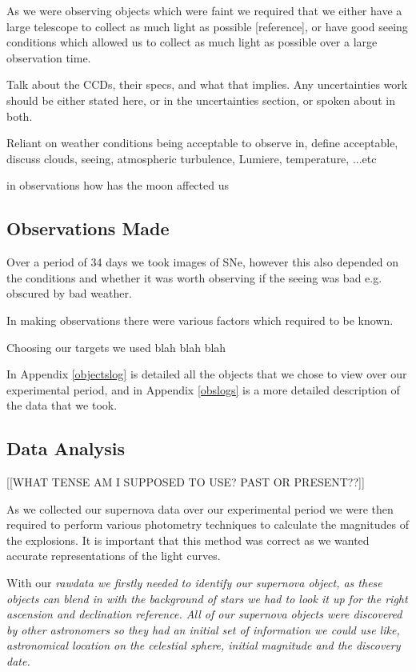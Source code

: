 \documentclass[twocolumn]{revtex4}
\begin{document}
As we were observing objects which were faint we required that we either have a large telescope to collect as much light as possible [reference], or have good seeing conditions which allowed us to collect as much light as possible over a large observation time.

Talk about the CCDs, their specs, and what that implies. Any uncertainties work should be either stated here, or in the uncertainties section, or spoken about in both. 

Reliant on weather conditions being acceptable to observe in, define acceptable, discuss clouds, seeing, atmospheric turbulence, Lumiere, temperature, ...etc

in observations how has the moon affected us


\vspace{-3ex}
\subsection{Observations Made}
\vspace{-2ex}

Over a period of 34 days we took images of SNe, however this also depended on the conditions and whether it was worth observing if the seeing was bad e.g. obscured by bad weather.

In making observations there were various factors which required to be known.

Choosing our targets we used blah blah blah

In Appendix \ref{objectslog} is detailed all the objects that we chose to view over our experimental period, and in Appendix \ref{obslogs} is a more detailed description of the data that we took.

\vspace{-3ex}
\subsection{Data Analysis}
\vspace{-2ex}

[[WHAT TENSE AM I SUPPOSED TO USE? PAST OR PRESENT??]]

As we collected our supernova data over our experimental period we were then required to perform various photometry techniques to calculate the magnitudes of the explosions. It is important that this method was correct as we wanted accurate representations of the light curves. 

With our \em{raw}\em data we firstly needed to identify our supernova object, as these objects can blend in with the background of stars we had to look it up for the right ascension and declination reference. All of our supernova objects were discovered by other astronomers so they had an initial set of information we could use like, astronomical location on the celestial sphere, initial magnitude and the discovery date.
\end{document}
